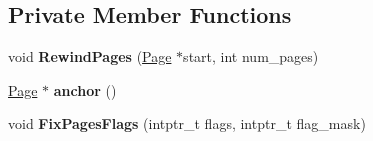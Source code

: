 \subsection*{Private Member Functions}
\begin{DoxyCompactItemize}
\item 
void {\bfseries Rewind\+Pages} (\hyperlink{classv8_1_1internal_1_1_page}{Page} $\ast$start, int num\+\_\+pages)\hypertarget{classv8_1_1internal_1_1_semi_space_aa634ed3952711290154755f307c9bb1c}{}\label{classv8_1_1internal_1_1_semi_space_aa634ed3952711290154755f307c9bb1c}

\item 
\hyperlink{classv8_1_1internal_1_1_page}{Page} $\ast$ {\bfseries anchor} ()\hypertarget{classv8_1_1internal_1_1_semi_space_a880e5a3632bbf113d3c0361f8fab0ea8}{}\label{classv8_1_1internal_1_1_semi_space_a880e5a3632bbf113d3c0361f8fab0ea8}

\item 
void {\bfseries Fix\+Pages\+Flags} (intptr\+\_\+t flags, intptr\+\_\+t flag\+\_\+mask)\hypertarget{classv8_1_1internal_1_1_semi_space_a09ee6981891fe47e6deca61456d7283f}{}\label{classv8_1_1internal_1_1_semi_space_a09ee6981891fe47e6deca61456d7283f}

\end{DoxyCompactItemize}
